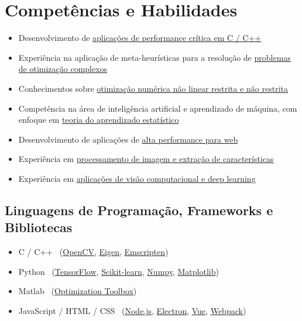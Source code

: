 \section{Competências e Habilidades}

\begin{itemize}
    \item Desenvolvimento de \hyperref[nlpp]{aplicações de performance crítica em C / C++}
    
    \item Experiência na aplicação de meta-heurísticas para a resolução de \hyperref[C-ITGO]{problemas de otimização complexos}

    \item Conhecimentos sobre \hyperref[nlpp]{otimização numérica não linear restrita e não restrita}

    \item Competência na área de inteligência artificial e aprendizado de máquina, com enfoque em \hyperref[mlpp]{teoria do aprendizado estatístico}

    \item Desenvolvimento de aplicações de \hyperref[js-nlp]{alta performance para web}

    \item Experiência em \hyperref[jseg]{processamento de imagem e extração de características}

    \item Experiência em \hyperref[eldorado]{aplicações de visão computacional e deep learning}

\end{itemize}



\subsection*{Linguagens de Programação, Frameworks e Bibliotecas}

\begin{itemize}
    \item C / C++ \ (\href{https://opencv.org/}{OpenCV},  \href{http://eigen.tuxfamily.org/index.php?title=Main_Page}{Eigen}, \href{https://kripken.github.io/emscripten-site/}{Emscripten})
    \item Python \ (\href{https://www.tensorflow.org/}{TensorFlow}, \href{http://scikit-learn.org/stable/index.html}{Scikit-learn}, \href{http://www.numpy.org/}{Numpy}, \href{https://matplotlib.org/}{Matplotlib})
    \item Matlab \ (\href{https://www.mathworks.com/products/optimization.html}{Optimization Toolbox})
    \item JavaScript / HTML / CSS \ (\href{https://nodejs.org/en/}{Node.js}, \href{https://electronjs.org/}{Electron}, \href{https://vuejs.org/}{Vue}, \href{https://webpack.js.org/}{Webpack})
\end{itemize}

\vspace{0.5cm}